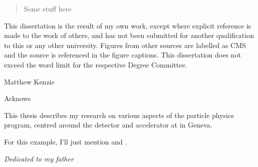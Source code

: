 
\begin{abstract}%
  Some stuff here
\end{abstract}


\begin{declaration}
  This dissertation is the result of my own work, except where explicit
  reference is made to the work of others, and has not been submitted
  for another qualification to this or any other university. Figures from other
  sources are labelled as CMS and the source is referenced in the figure captions.
  This dissertation does not exceed the word limit for the respective Degree
  Committee.
  \vspace*{1cm}
  \begin{flushright}
    Matthew Kenzie
  \end{flushright}
\end{declaration}


\begin{acknowledgements}
  Acknows
\end{acknowledgements}


\begin{preface}
  This thesis describes my research on various aspects of the \LHCb
  particle physics program, centred around the \LHCb detector and \LHC
  accelerator at \CERN in Geneva.

  \noindent
  For this example, I'll just mention 
  and .
\end{preface}

\tableofcontents


\newpage
\begin{center}
\textit{Dedicated to my father}
\end{center}


